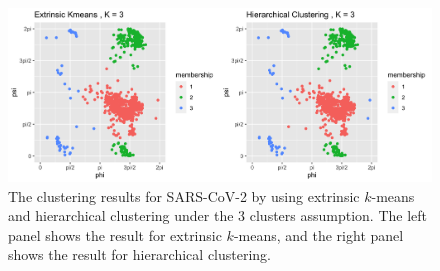 \begin{figure}[hbt!]
     \centering
     \includegraphics[scale = 0.135]{others.png}
     \caption{The clustering results for SARS-CoV-2 by using extrinsic $k$-means and hierarchical clustering under the 3 clusters assumption. The left panel shows the result for extrinsic $k$-means, and the right panel shows the result for hierarchical clustering.}
     \label{fig:others}
\end{figure}


